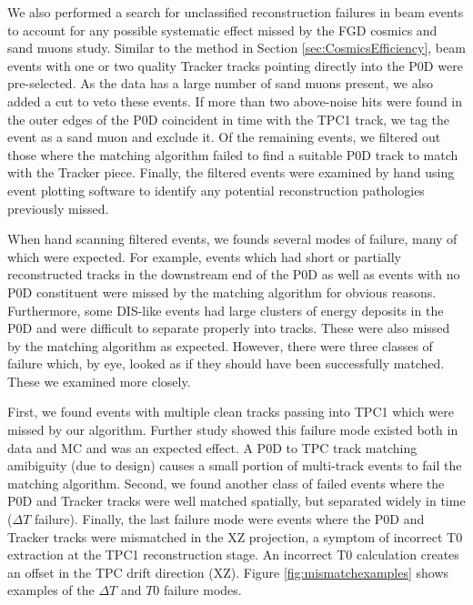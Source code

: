 We also performed a search for unclassified reconstruction failures in beam events to account for any possible systematic effect missed by the FGD cosmics and sand muons study. Similar to the method in Section \ref{sec:CosmicsEfficiency}, beam events with one or two quality Tracker tracks pointing directly into the P0D were pre-selected. As the data has a large number of sand muons present, we also added a cut to veto these events. If more than two above-noise hits were found in the outer edges of the P0D coincident in time with the TPC1 track, we tag the event as a sand muon and exclude it. Of the remaining events, we filtered out those where the matching algorithm failed to find a suitable P0D track to match with the Tracker piece. Finally, the filtered events were examined by hand using event plotting software to identify any potential reconstruction pathologies previously missed.

When hand scanning filtered events, we founds several modes of failure, many of which were expected. For example, events which had short or partially reconstructed tracks in the downstream end of the P0D as well as events with no P0D constituent were missed by the matching algorithm for obvious reasons. Furthermore, some DIS-like events had large clusters of energy deposits in the P0D and were difficult to separate properly into tracks. These were also missed by the matching algorithm as expected. However, there were three classes of failure which, by eye, looked as if they should have been successfully matched. These we examined more closely.

First, we found events with multiple clean tracks passing into TPC1 which were missed by our algorithm. Further study showed this failure mode existed both in data and MC and was an expected effect. A P0D to TPC track matching amibiguity (due to design) causes a small portion of multi-track events to fail the matching algorithm. Second, we found another class of failed events where the P0D and Tracker tracks were well matched spatially, but separated widely in time ($\Delta T$ failure). Finally, the last failure mode were events where the P0D and Tracker tracks were mismatched in the XZ projection, a symptom of incorrect T0 extraction at the TPC1 reconstruction stage. An incorrect T0 calculation creates an offset in the TPC drift direction (XZ). Figure \ref{fig:mismatchexamples} shows examples of the $\Delta T$ and $T0$ failure modes.

